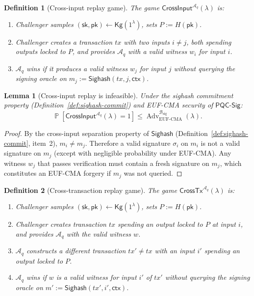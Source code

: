 \documentclass[11pt]{article}
\newtheorem{definition}{Definition}
\newtheorem{lemma}{Lemma}
\newcommand{\Prob}{\operatorname{\mathbb{P}}}
\newcommand{\Adv}{\operatorname{Adv}}
\newcommand{\Aq}{\mathcal{A}_q}
\newcommand{\PQC}{\mathsf{PQC}}
\newcommand{\Sighash}{\mathsf{Sighash}}
\begin{document}
\begin{definition}[Cross-input replay game]\label{def:cross-input}
The game $\mathsf{CrossInput}^{\Aq}(\lambda)$ is:
\begin{enumerate}[leftmargin=2em]
  \item Challenger samples $(\mathsf{sk},\mathsf{pk})\gets\mathsf{Kg}(1^\lambda)$, sets $P:=H(\mathsf{pk})$.
  \item Challenger creates a transaction $tx$ with two inputs $i\neq j$, both spending outputs locked to $P$, and provides $\Aq$ with a valid witness $w_i$ for input $i$.
  \item $\Aq$ wins if it produces a valid witness $w_j$ for input $j$ without querying the signing oracle on $m_j:=\Sighash(tx,j,\textsf{ctx})$.
\end{enumerate}
\end{definition}

\begin{lemma}[Cross-input replay is infeasible]\label{lem:cross-input}
Under the sighash commitment property (Definition~\ref{def:sighash-commit}) and EUF-CMA security of $\PQC\textsf{-Sig}$:
\[
\Prob[\mathsf{CrossInput}^{\Aq}(\lambda)=1] \le \Adv_{\mathrm{EUF\mbox{-}CMA}}^{\mathcal{B}_{\mathrm{sig}}}(\lambda).
\]
\end{lemma}

\begin{proof}
By the cross-input separation property of $\Sighash$ (Definition~\ref{def:sighash-commit}, item~2), $m_i\neq m_j$.
Therefore a valid signature $\sigma_i$ on $m_i$ is not a valid signature on $m_j$ (except with negligible probability under EUF-CMA).
Any witness $w_j$ that passes verification must contain a fresh signature on $m_j$, which constitutes an EUF-CMA forgery if $m_j$ was not queried.
\end{proof}

\begin{definition}[Cross-transaction replay game]\label{def:cross-tx}
The game $\mathsf{CrossTx}^{\Aq}(\lambda)$ is:
\begin{enumerate}[leftmargin=2em]
  \item Challenger samples $(\mathsf{sk},\mathsf{pk})\gets\mathsf{Kg}(1^\lambda)$, sets $P:=H(\mathsf{pk})$.
  \item Challenger creates transaction $tx$ spending an output locked to $P$ at input $i$, and provides $\Aq$ with the valid witness $w$.
  \item $\Aq$ constructs a different transaction $tx'\neq tx$ with an input $i'$ spending an output locked to $P$.
  \item $\Aq$ wins if $w$ is a valid witness for input $i'$ of $tx'$ without querying the signing oracle on $m':=\Sighash(tx',i',\textsf{ctx})$.
\end{enumerate}
\end{definition}
\end{document}
